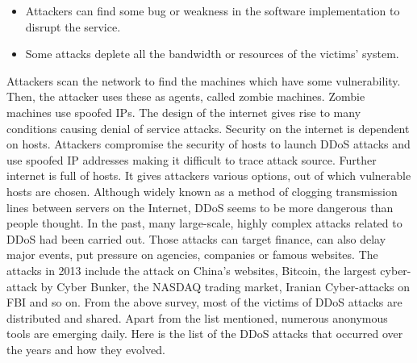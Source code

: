 \documentclass{ijitcs}
\begin{document}
\begin{itemize}
\item Attackers can find some bug or weakness in the software implementation to disrupt the service.
\item Some attacks deplete all the bandwidth or resources of the victims' system.
\end{itemize}
Attackers scan the network to find the machines which have some vulnerability. Then, the attacker uses these as agents, called zombie machines. Zombie machines use spoofed IPs. The design of the internet gives rise to many conditions causing denial of service attacks. Security on the internet is dependent on hosts. Attackers compromise the security of hosts to launch DDoS
attacks and use spoofed IP addresses making it difficult to trace attack source. Further internet is full of hosts. It
gives attackers various options, out of which vulnerable hosts are chosen\cite{deshmukh2015understanding}. Although widely known as a method of clogging transmission lines between servers on the Internet, DDoS seems to be more dangerous than people thought. In the past, many large-scale, highly complex attacks related to DDoS had been carried out. Those attacks can target finance, can also delay major events, put pressure on agencies, companies or famous websites. The attacks in 2013 include the attack on China’s websites, Bitcoin, the largest cyber-attack by Cyber Bunker, the NASDAQ trading market, Iranian Cyber-attacks on FBI and so on. From the above survey, most of the victims of DDoS
attacks are distributed and shared. Apart from the list mentioned, numerous anonymous tools are emerging daily. Here is the list of the DDoS attacks that occurred over the years and how they evolved.
\end{document}
